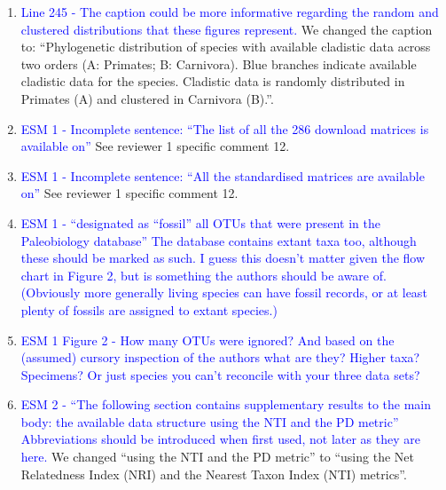 \documentclass[12pt,letterpaper]{article}
\begin{document}
\begin{enumerate}
\item{\textcolor{blue}{Line 245 - The caption could be more informative regarding the random and clustered distributions that these figures represent.}}
We changed the caption to: ``Phylogenetic distribution of species with available cladistic data across two orders (A: Primates; B: Carnivora). Blue branches indicate available cladistic data for the species. Cladistic data is randomly distributed in Primates (A) and clustered in Carnivora (B).''.

\item{\textcolor{blue}{ESM 1 - Incomplete sentence: ``The list of all the 286 download matrices is available on''}}
See reviewer 1 specific comment 12.

\item{\textcolor{blue}{ESM 1 - Incomplete sentence: ``All the standardised matrices are available on''}}
See reviewer 1 specific comment 12.

\item{\textcolor{blue}{ESM 1 - ``designated as ``fossil'' all OTUs that were present in the Paleobiology database'' The database contains extant taxa too, although these should be marked as such. I guess this doesn’t matter given the flow chart in Figure 2, but is something the authors should be aware of. (Obviously more generally living species can have fossil records, or at least plenty of fossils are assigned to extant species.)}}

\item{\textcolor{blue}{ESM 1 Figure 2 - How many OTUs were ignored? And based on the (assumed) cursory inspection of the authors what are they? Higher taxa? Specimens? Or just species you can’t reconcile with your three data sets?}}

\item{\textcolor{blue}{ESM 2 - ``The following section contains supplementary results to the main body: the available data structure using the NTI and the PD metric'' Abbreviations should be introduced when first used, not later as they are here.}}
We changed ``using the NTI and the PD metric'' to ``using the Net Relatedness Index (NRI) and the Nearest Taxon Index (NTI) metrics''.
\end{enumerate}
\end{document}
